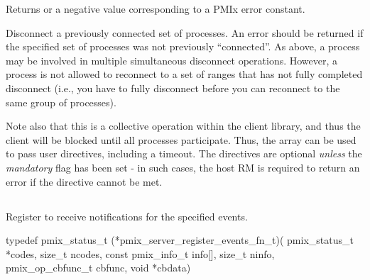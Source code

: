 Returns  or a negative value corresponding to a PMIx error constant.

\descr

Disconnect a previously connected set of processes.
An error should be returned if the specified set of processes was not previously ``connected''.
As above, a process may be involved in multiple simultaneous disconnect operations.
However, a process is not allowed to reconnect to a set of ranges that has not fully completed disconnect (i.e., you have to fully disconnect before you can reconnect to the same group of processes).

Note also that this is a collective operation within the client library, and thus the client will be blocked until all processes participate.
Thus, the  array can be used to pass user directives, including a timeout.
The directives are optional \emph{unless} the \emph{mandatory} flag has been set - in such cases, the host RM is required to return an error if the directive cannot be met.


\subsection{}

\summary

Register to receive notifications for the specified events.

\format

\cspecificstart
\begin{codepar}
 typedef pmix_status_t (*pmix_server_register_events_fn_t)(
                              pmix_status_t *codes, size_t ncodes,
                              const pmix_info_t info[], size_t ninfo,
                              pmix_op_cbfunc_t cbfunc, void *cbdata)
\end{codepar}
\cspecificend

\begin{arglist}
\end{arglist}

